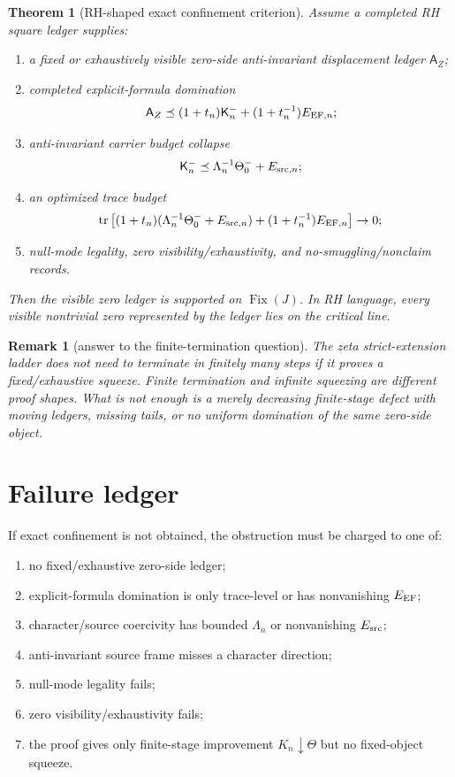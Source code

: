 \documentclass[11pt]{article}
\newtheorem{theorem}{Theorem}
\newtheorem{remark}{Remark}
\newcommand{\AZ}{\mathsf A_Z}
\newcommand{\K}{\mathsf K}
\newcommand{\Fix}{\operatorname{Fix}}
\newcommand{\tr}{\operatorname{tr}}
\begin{document}
\begin{theorem}[RH-shaped exact confinement criterion]
Assume a completed RH square ledger supplies:
\begin{enumerate}[label=(O\arabic*)]
\item a fixed or exhaustively visible zero-side anti-invariant displacement ledger $\AZ$;
\item completed explicit-formula domination
\[
  \AZ\preceq(1+t_n)\K_n^-+(1+t_n^{-1})E_{{\rm EF},n};
\]
\item anti-invariant carrier budget collapse
\[
  \K_n^-\preceq \Lambda_n^{-1}\Theta_0^-+E_{{\rm src},n};
\]
\item an optimized trace budget
\[
  \tr\left[(1+t_n)(\Lambda_n^{-1}\Theta_0^-+E_{{\rm src},n})+(1+t_n^{-1})E_{{\rm EF},n}\right]\to0;
\]
\item null-mode legality, zero visibility/exhaustivity, and no-smuggling/nonclaim records.
\end{enumerate}
Then the visible zero ledger is supported on $\Fix(J)$. In RH language, every visible nontrivial zero represented by the ledger lies on the critical line.
\end{theorem}

\begin{remark}[answer to the finite-termination question]
The zeta strict-extension ladder does not need to terminate in finitely many steps if it proves a fixed/exhaustive squeeze. Finite termination and infinite squeezing are different proof shapes. What is not enough is a merely decreasing finite-stage defect with moving ledgers, missing tails, or no uniform domination of the same zero-side object.
\end{remark}

\section{Failure ledger}
If exact confinement is not obtained, the obstruction must be charged to one of:
\begin{enumerate}[label=(F\arabic*)]
\item no fixed/exhaustive zero-side ledger;
\item explicit-formula domination is only trace-level or has nonvanishing $E_{\rm EF}$;
\item character/source coercivity has bounded $\Lambda_n$ or nonvanishing $E_{\rm src}$;
\item anti-invariant source frame misses a character direction;
\item null-mode legality fails;
\item zero visibility/exhaustivity fails;
\item the proof gives only finite-stage improvement $K_n\downarrow\Theta$ but no fixed-object squeeze.
\end{enumerate}
\end{document}
